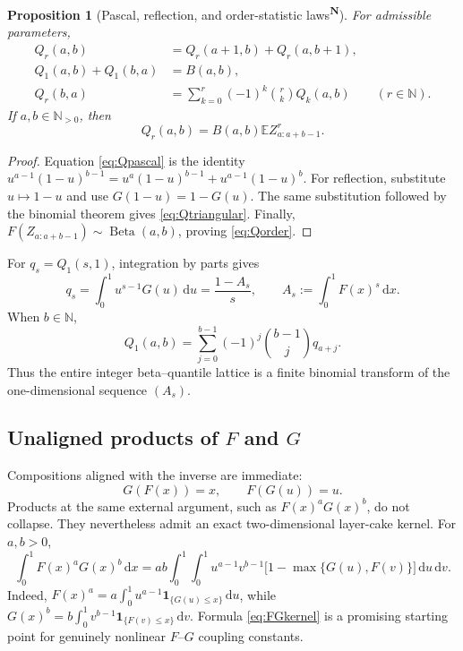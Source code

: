 \documentclass[11pt,oneside]{article}
\newtheorem{proposition}[theorem]{Proposition}
\theoremstyle{definition}
\theoremstyle{remark}
\newcommand{\F}{F}
\newcommand{\G}{G}
\newcommand{\E}{\mathbb E}
\newcommand{\N}{\mathbb N}
\newcommand{\dd}{\,\mathrm d}
\newcommand{\Beta}{\operatorname{Beta}}
\newcommand{\tagnew}{\textsuperscript{\textcolor{oliveink}{\bfseries N}}}
\begin{document}
\begin{proposition}[Pascal, reflection, and order-statistic laws\tagnew]
For admissible parameters,
\begin{align}
 Q_r(a,b)&=Q_r(a+1,b)+Q_r(a,b+1),\label{eq:Qpascal}\\
 Q_1(a,b)+Q_1(b,a)&=B(a,b),\label{eq:Qreflection}\\
 Q_r(b,a)&=\sum_{k=0}^r(-1)^k\binom rk Q_k(a,b)
 \qquad(r\in\N).\label{eq:Qtriangular}
\end{align}
If \(a,b\in\N_{>0}\), then
\begin{equation}\label{eq:Qorder}
 Q_r(a,b)=B(a,b)\E Z_{a:a+b-1}^r.
\end{equation}
\end{proposition}

\begin{proof}
Equation \eqref{eq:Qpascal} is the identity
\(u^{a-1}(1-u)^{b-1}=u^a(1-u)^{b-1}+u^{a-1}(1-u)^b\).
For reflection, substitute \(u\mapsto1-u\) and use
\(\G(1-u)=1-\G(u)\).  The same substitution followed by the binomial theorem
gives \eqref{eq:Qtriangular}.  Finally,
\(\F(Z_{a:a+b-1})\sim\Beta(a,b)\), proving \eqref{eq:Qorder}.
\end{proof}

For \(q_s=Q_1(s,1)\), integration by parts gives
\begin{equation}\label{eq:qA}
 q_s=\int_0^1u^{s-1}\G(u)\dd u=\frac{1-A_s}{s},
 \qquad A_s:=\int_0^1\F(x)^s\dd x.
\end{equation}
When \(b\in\N\),
\begin{equation}\label{eq:Qfinitediff}
 Q_1(a,b)=\sum_{j=0}^{b-1}(-1)^j\binom{b-1}{j}q_{a+j}.
\end{equation}
Thus the entire integer beta--quantile lattice is a finite binomial transform of
the one-dimensional sequence \((A_s)\).

\subsection{Unaligned products of \(\F\) and \(\G\)}

Compositions aligned with the inverse are immediate:
\[
 \G(\F(x))=x,
 \qquad \F(\G(u))=u.
\]
Products at the same external argument, such as \(\F(x)^a\G(x)^b\), do not
collapse.  They nevertheless admit an exact two-dimensional layer-cake kernel.
For \(a,b>0\),
\begin{equation}\label{eq:FGkernel}
 \int_0^1\F(x)^a\G(x)^b\dd x
 =ab\int_0^1\!\int_0^1
 u^{a-1}v^{b-1}
 \bigl[1-\max\{\G(u),\F(v)\}\bigr]\dd u\dd v.
\end{equation}
Indeed,
\(\F(x)^a=a\int_0^1u^{a-1}\mathbf1_{\{\G(u)\le x\}}\dd u\), while
\(\G(x)^b=b\int_0^1v^{b-1}\mathbf1_{\{\F(v)\le x\}}\dd v\).  Formula
\eqref{eq:FGkernel} is a promising starting point for genuinely nonlinear
\(\F\)--\(\G\) coupling constants.
\end{document}
